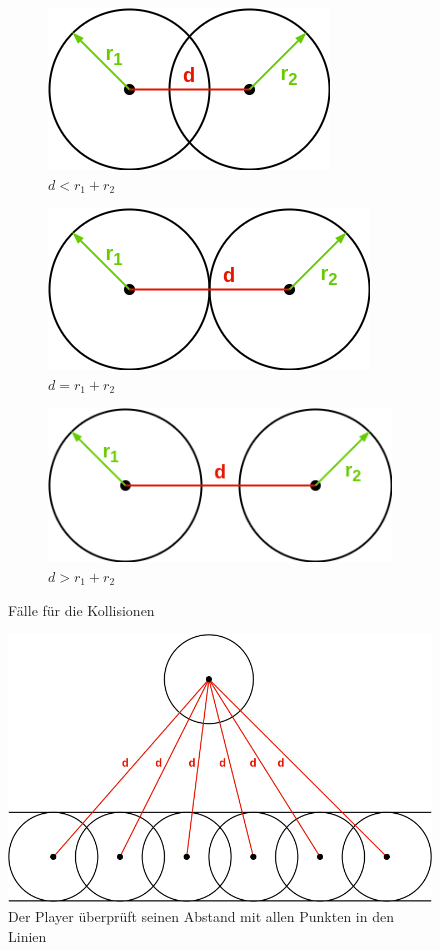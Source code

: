 \documentclass[doktyp=studarbeit]{TUBAFarbeiten}
\begin{document}
\begin{figure}[!htb]
    \centering
    \begin{subfigure}[b]{0.45\textwidth}
        \centering
        \includegraphics[height=0.1\textheight]{collisions-3.png}
        \caption{$d < r_{1} + r_{2}$}
    \end{subfigure}
    \qquad
    \begin{subfigure}[b]{0.45\textwidth}
        \centering
        \includegraphics[height=0.1\textheight]{collisions-4.png}
        \caption{$d = r_{1} + r_{2}$}
    \end{subfigure}
    \qquad
    \begin{subfigure}[b]{0.45\textwidth}
        \centering
        \includegraphics[height=0.1\textheight]{collisions-5.png}
        \caption{$d > r_{1} + r_{2}$}
    \end{subfigure}
    \caption{Fälle für die Kollisionen}
    \label{fig:collisions-1}
\end{figure}

\begin{figure}[!htb]
    \centering
    \includegraphics[width=0.6\linewidth]{collisions-2.png}
    \caption{Der Player überprüft seinen Abstand mit allen Punkten in den Linien}
    \label{fig:collisions-2}
\end{figure}
\end{document}
